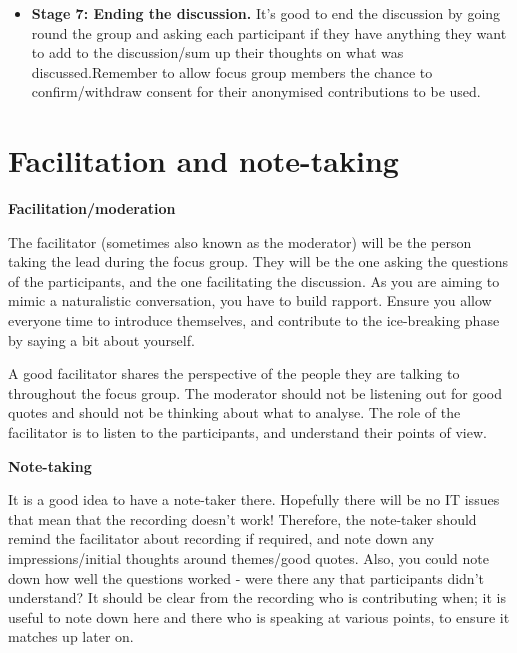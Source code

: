 \documentclass[
  english,
  letterpaper,
  DIV=11,
  numbers=noendperiod]{scrreprt}
\begin{document}
\begin{itemize}
  discussion so that everyone gets a chance to contribute. Have a few
  specific prompts that relate to each question and/or some general
  prompts to keep the discussion flowing. What are you going to do if
  no-one participates? Or if one person is contributing? For
  example\ldots{} ``has anyone else had a similar experience? Does
  anyone have a different view?'' At the same time be ethical and avoid
  targeting individual people. Give participants the opportunity to
  describe their interpretations and take ownership. E.g., ``How
  would\ldots make you feel'', ``Have you ever noticed that\ldots{}''
  ``Think back to when\ldots{}'', ``What was most important to you
  about\ldots?''
\item
  \textbf{Stage 7: Ending the discussion.} It's good to end the
  discussion by going round the group and asking each participant if
  they have anything they want to add to the discussion/sum up their
  thoughts on what was discussed.Remember to allow focus group members
  the chance to confirm/withdraw consent for their anonymised
  contributions to be used.
\end{itemize}

\section{Facilitation and
note-taking}\label{facilitation-and-note-taking}

\textbf{Facilitation/moderation}

The facilitator (sometimes also known as the moderator) will be the
person taking the lead during the focus group. They will be the one
asking the questions of the participants, and the one facilitating the
discussion. As you are aiming to mimic a naturalistic conversation, you
have to build rapport. Ensure you allow everyone time to introduce
themselves, and contribute to the ice-breaking phase by saying a bit
about yourself.

A good facilitator shares the perspective of the people they are talking
to throughout the focus group. The moderator should not be listening out
for good quotes and should not be thinking about what to analyse. The
role of the facilitator is to listen to the participants, and understand
their points of view.

\textbf{Note-taking}

It is a good idea to have a note-taker there. Hopefully there will be no
IT issues that mean that the recording doesn't work! Therefore, the
note-taker should remind the facilitator about recording if required,
and note down any impressions/initial thoughts around themes/good
quotes. Also, you could note down how well the questions worked - were
there any that participants didn't understand? It should be clear from
the recording who is contributing when; it is useful to note down here
and there who is speaking at various points, to ensure it matches up
later on.
\end{document}
